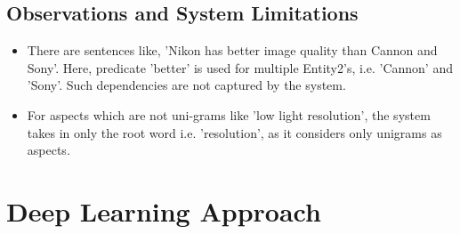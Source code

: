 \documentclass[12pt]{article}
\begin{document}
\subsection{Observations and System Limitations}
\begin{itemize}
\item There are sentences like, 'Nikon has better image quality than Cannon and Sony'. Here, predicate 'better' is used for multiple Entity2's, i.e. 'Cannon' and 'Sony'. Such dependencies are not captured by the system.

\item For aspects which are not uni-grams like 'low light resolution', the system takes in only the root word i.e. 'resolution', as it considers only unigrams as aspects.

\end{itemize}

\section{Deep Learning Approach}
\end{document}

